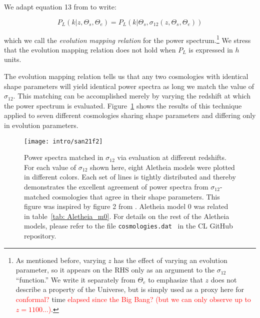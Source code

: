 We adapt equation 13 from \citet{San21} to write:

\begin{equation}
\label{eq: evMapping_pSpectrum}
    P_L (k | z, \Theta_s, \Theta_e)
    =
    P_L (k | \Theta_s, \sigma_{12} \left( z, \Theta_s, \Theta_e \right))
\end{equation}

which we call the \textit{evolution mapping relation} for the power
spectrum.\footnote{As mentioned before, varying $z$ has the effect of varying 
an evolution parameter, so it appears on the RHS only as an argument 
to the $\sigma_{12}$ ``function.'' We write it separately from
$\Theta_e$ to
emphasize that $z$ does not describe a property of the Universe, but is
simply used as a proxy here for \textcolor{red}{conformal?} time
\textcolor{red}{elapsed since the Big Bang? (but we can only observe up to
$z = 1100$...)}.} 
We stress that the evolution mapping relation does not hold when $P_L$ is
expressed in $h$ units.


The evolution mapping relation tells us that any two cosmologies with 
identical shape
parameters will yield identical power spectra as long we match the value of
$\sigma_{12}$. This matching can be accomplished merely by varying the 
redshift at which the power spectrum is evaluated.
Figure~\ref{fig: ev_mapping_demo} shows the results of this technique applied
to seven different cosmologies sharing shape parameters and differing only
in evolution parameters.

\begin{figure}[ht!]
  \centering
  \texttt{[image: intro/san21f2]}
  \cprotect\caption[Demonstration of evolution mapping]{Power spectra matched
  	in $\sigma_{12}$ via evaluation at different redshifts. For each value of
  	$\sigma_{12}$
  	shown here, eight Aletheia models were plotted in different
  	colors. Each set of lines is tightly distributed and thereby demonstrates 
  	the excellent agreement of power spectra from $\sigma_{12}$-matched
  	cosmologies that agree in their shape parameters. This figure was
  	inspired by figure 2 from \citet{San21}. Aletheia model 0 was related in
  	table~\ref{tab: Aletheia_m0}. For details on the rest of the Aletheia
  	models, please refer to the file
  	\verb|cosmologies.dat|\footnotemark
  	\, in the CL GitHub repository.}
  \label{fig: ev_mapping_demo}
\end{figure}


